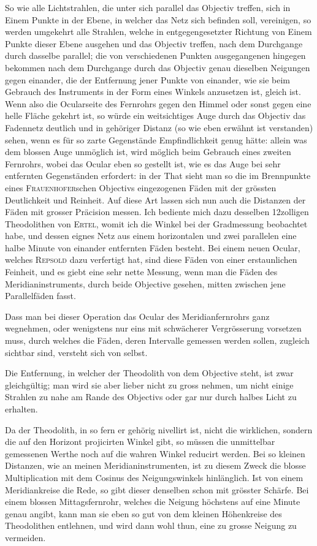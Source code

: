 So wie alle Lichtstrahlen, die unter sich parallel das Objectiv treffen, sich in Einem Punkte in der
Ebene, in welcher das Netz sich befinden soll, vereinigen, so werden umgekehrt alle Strahlen, welche
in entgegengesetzter Richtung von Einem Punkte dieser Ebene ausgehen und das Objectiv treffen, nach
dem Durchgange durch dasselbe parallel; die von verschiedenen Punkten ausgegangenen hingegen
bekommen nach dem Durchgange durch das Objectiv genau dieselben Neigungen gegen einander, die der
Entfernung jener Punkte von einander, wie sie beim Gebrauch des Instruments in der Form eines
Winkels anzusetzen ist, gleich ist. Wenn also die Ocularseite des Fernrohrs gegen den Himmel oder
sonst gegen eine helle Fläche gekehrt ist, so würde ein weitsichtiges Auge durch das Objectiv das
Fadennetz deutlich und in gehöriger Distanz (so wie eben erwähnt ist verstanden) sehen, wenn es für
so zarte Gegenstände Empfindlichkeit genug hätte: allein was dem blossen Auge unmöglich ist, wird
möglich beim Gebrauch eines zweiten Fernrohrs, wobei das Ocular eben so gestellt ist, wie es das Auge
bei sehr entfernten Gegenständen erfordert: in der That sieht man so die im Brennpunkte eines
\textsc{Frauenhofer}schen Objectivs eingezogenen Fäden mit der grössten Deutlichkeit und Reinheit. 
Auf diese Art lassen sich nun auch die Distanzen der Fäden mit grosser Präcision messen. Ich bediente
mich dazu desselben 12zolligen Theodolithen von \textsc{Ertel}, womit ich die Winkel bei der
Gradmessung beobachtet habe, und dessen eignes Netz aus einem horizontalen und zwei parallelen eine
halbe Minute von einander entfernten Fäden besteht. Bei einem neuen Ocular, welches \textsc{Repsold}
dazu verfertigt hat, sind diese Fäden von einer erstaunlichen Feinheit, und es giebt eine sehr nette
Messung, wenn man die Fäden des Meridianinstruments, durch beide Objective gesehen, mitten zwischen
jene Parallelfäden fasst.

Dass man bei dieser Operation das Ocular des Meridianfernrohrs ganz wegnehmen, oder wenigstens nur
eins mit schwächerer Vergrösserung vorsetzen muss, durch welches die Fäden, deren Intervalle gemessen
werden sollen, zugleich sichtbar sind, versteht sich von selbst.

Die Entfernung, in welcher der Theodolith von dem Objective steht, ist zwar gleichgültig; man wird
sie aber lieber nicht zu gross nehmen, um nicht einige Strahlen zu nahe am Rande des Objectivs oder
gar nur durch halbes Licht zu erhalten.

%
Da der Theodolith, in so fern er gehörig nivellirt ist, nicht die wirklichen, sondern die auf den
Horizont projicirten Winkel gibt, so müssen die unmittelbar gemessenen Werthe noch auf die wahren
Winkel reducirt werden. Bei so kleinen Distanzen, wie an meinen Meridianinstrumenten, ist zu diesem
Zweck die blosse Multiplication mit dem Cosinus des Neigungswinkels hinlänglich. Ist von einem
Meridiankreise die Rede, so gibt dieser denselben schon mit grösster Schärfe. Bei einem blossen
Mittagsfernrohr, welches die Neigung höchstens auf eine Minute genau angibt, kann man sie eben so
gut von dem kleinen Höhenkreise des Theodolithen entlehnen, und wird dann wohl thun, eine zu grosse
Neigung zu vermeiden.

